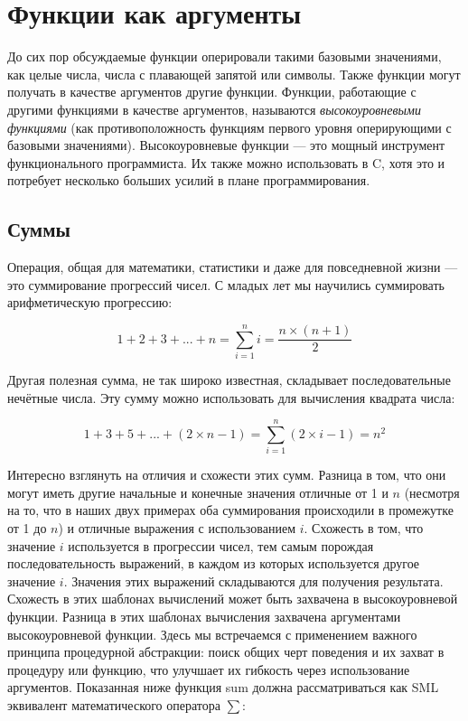 \section{Функции как аргументы}\label{FunctionsArgs}

До сих пор обсуждаемые функции оперировали такими базовыми значениями, как целые числа, числа с плавающей запятой или символы. Также функции могут получать в качестве аргументов другие функции. Функции, работающие с другими функциями в качестве аргументов, называются \emph{высокоуровневыми функциями} (как противоположность функциям первого уровня оперирующими с базовыми значениями). Высокоуровневые функции --- это мощный инструмент функционального программиста. Их также можно использовать в C, хотя это и потребует несколько больших усилий в плане программирования.

\subsection{Суммы}\label{Sums}

Операция, общая для математики, статистики и даже для повседневной жизни --- это суммирование прогрессий чисел. С младых лет мы научились суммировать арифметическую прогрессию:

\begin{equation}
  1+2+3+...+n = \sum \limits_{i=1}^n i = \frac {n \times (n+1)} {2}
\end{equation}

Другая полезная сумма, не так широко известная, складывает последовательные нечётные числа. Эту сумму можно использовать для вычисления квадрата числа:

\begin{equation}
  1+3+5+...+(2 \times n-1) = \sum \limits_{i=1}^n (2 \times i -1) = n^2 \label{eq_2.6}
\end{equation}

Интересно взглянуть на отличия и схожести этих сумм. Разница в том, что они могут иметь другие начальные и конечные значения отличные от 1 и $n$ (несмотря на то, что в наших двух примерах оба суммирования происходили в промежутке от 1 до $n$) и отличные выражения с использованием $i$. Схожесть в том, что значение $i$ используется в прогрессии чисел, тем самым порождая последовательность выражений, в каждом из которых используется другое значение $i$. Значения этих выражений складываются для получения результата. Схожесть в этих шаблонах вычислений может быть захвачена в высокоуровневой функции. Разница в этих шаблонах вычисления захвачена аргументами высокоуровневой функции. Здесь мы встречаемся с применением важного принципа процедурной абстракции: поиск общих черт поведения и их захват в процедуру или функцию, что улучшает их гибкость через использование аргументов. Показанная ниже функция sum должна рассматриваться как SML эквивалент математического оператора $\sum$:

